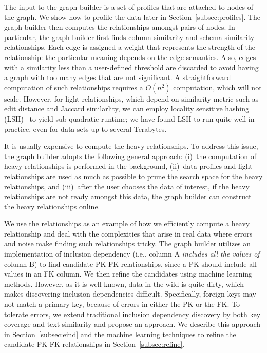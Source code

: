 The input to the graph builder is a set of profiles that are attached to nodes
of the graph. We show how to profile the data later in Section~\ref{subsec:profiles}. The graph builder then computes the relationships amongst pairs of
nodes. In particular, the graph builder first finds column similarity and
schema similarity relationships.  Each edge is assigned a weight that represents
the strength of the relationship: the particular meaning depends on the edge
semantics.  Also, edges with a similarity less than a user-defined threshold are
discarded to avoid having a graph with too many edges that are not significant.
A straightforward computation of such relationships requires a $O(n^2)$
computation, which will not scale.  However, for light-relationships, which depend on similarity metric
such as edit distance and Jaccard similarlity, we can employ locality sensitive hashing
(LSH)~\cite{DBLP:conf/compgeom/DatarIIM04} to yield sub-quadratic runtime; we have found LSH to run quite well in practice, even for data sets up to several Terabytes.

It is usually expensive to compute the heavy relationships. To address this
issue, the graph builder adopts the following general approach: (i)~the
computation of heavy relationships is performed in the background, (ii)~data
profiles and light relationships are used as much as possible to prune the
search space for the heavy relationships, and (iii)~after the user chooses the data of
interest, if the heavy relationships are not ready amongst this data, the graph builder can construct the heavy relationships online.

We use the \pkfk relationships as an example of how
we efficiently compute a heavy relationship and deal with the complexities that arise in real data where errors and noise make finding
such relationships tricky. The graph builder utilizes an
implementation of inclusion dependency (i.e., column A {\it includes all the values of} column B) to find candidate PK-FK relationships, since a PK should include all values in an FK column.  We then 
 refine the candidates using machine learning methods. However,
as it is well known, data in the wild is quite dirty, which makes discovering
inclusion dependencies difficult. Specifically, foreign keys may not match a
primary key, because of errors in either the PK or the FK. To tolerate errors,
we extend traditional inclusion dependency discovery by both key coverage and
text similarity and propose an \emph{\eind} approach. 
We describe this approach in Section~\ref{subsec:eind} and the machine learning
techniques to refine the candidate PK-FK relationships in Section~\ref{subsec:refine}.


